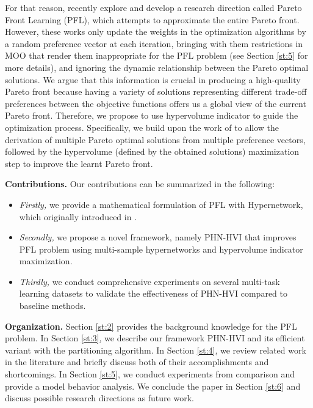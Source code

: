 \documentclass[letterpaper]{article} %
\newcommand{\ourmodel}{PHN-HVI }
\begin{document}
For that reason, \cite{controllable, navon2021learning, ruchte2021scalable} recently explore and develop a research direction called Pareto Front Learning (PFL), which attempts to approximate the entire Pareto front. However, these works only update the weights in the optimization algorithms by a random preference vector at each iteration, bringing with them restrictions in MOO that render them inappropriate for the PFL problem (see Section \ref{st:5} for more details), and ignoring the dynamic relationship between the Pareto optimal solutions. We argue that this information is crucial in producing a high-quality Pareto front because having a variety of solutions representing different trade-off preferences between the objective functions offers us a global view of the current Pareto front. Therefore, we propose to use hypervolume indicator to guide the optimization process. Specifically, we build upon the work of \cite{navon2021learning} to allow the derivation of multiple Pareto optimal solutions from multiple preference vectors, followed by the hypervolume (defined by the obtained solutions) maximization step to improve the learnt Pareto front.

{\bf Contributions.} Our contributions can be summarized in the following:
\begin{itemize}
    \item \emph{Firstly,} we provide a mathematical formulation of PFL with Hypernetwork, which originally introduced in \cite{navon2021learning}.
    \item \emph{Secondly,} we propose a novel framework, namely \ourmodel that improves PFL problem using multi-sample hypernetworks and hypervolume indicator maximization.
    \item \emph{Thirdly,} we conduct comprehensive experiments on several multi-task learning datasets to validate the effectiveness of \ourmodel compared to baseline methods.
\end{itemize}

{\bf Organization.} Section \ref{st:2} provides the background knowledge for the PFL problem. In Section \ref{st:3}, we describe our framework \ourmodel and its efficient variant with the partitioning algorithm. In Section \ref{st:4}, we review related work in the literature and briefly discuss both of their accomplishments and shortcomings. In Section \ref{st:5}, we conduct experiments from comparison and provide a model behavior analysis. We conclude the paper in Section \ref{st:6} and discuss possible research directions as future work.
\end{document}
